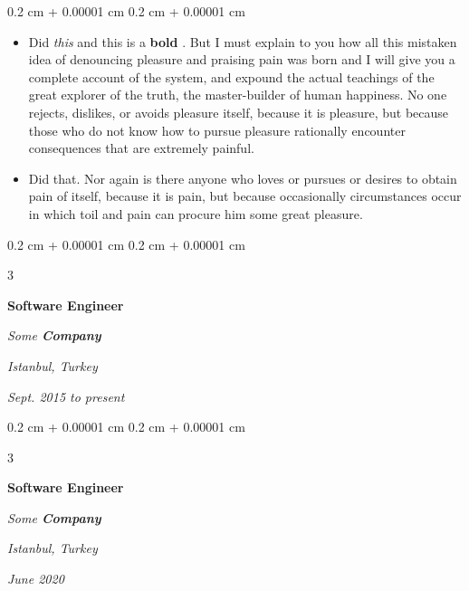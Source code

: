 \documentclass[10pt, letterpaper]{article}
\newenvironment{highlights}{
    \begin{itemize}[
        topsep=0.10 cm,
        parsep=0.10 cm,
        partopsep=0pt,
        itemsep=0pt,
        leftmargin=0.4 cm + 10pt + 0.6 cm
    ]
}{
    \end{itemize}
} %
\newenvironment{onecolentry}{
    \begin{adjustwidth}{
        0.2 cm + 0.00001 cm
    }{
        0.2 cm + 0.00001 cm
    }
}{
    \end{adjustwidth}
} %
\newenvironment{threecolentry}[3][]{
    \onecolentry
    \def\thirdColumn{#3}
    \setcolumnwidth{0.6 cm, \fill, 4.5 cm}
    \begin{paracol}{3}
    #2 \switchcolumn
}{
    \switchcolumn \raggedleft \thirdColumn
    \end{paracol}
    \endonecolentry
} %
\let\hrefWithoutArrow\href
\renewcommand{\href}[2]{\hrefWithoutArrow{#1}{\mbox{\ifthenelse{\equal{#2}{}}{ }{#2 }\raisebox{.15ex}{\footnotesize \faExternalLink*}}}}
\begin{document}
        \vspace{0.10 cm-3px}
        \begin{onecolentry}
            \begin{highlights}
                \item Did \textit{this} and this is a \textbf{bold} \href{https://example.com}{link}. But I must explain to you how all this mistaken idea of denouncing pleasure and praising pain was born and I will give you a complete account of the system, and expound the actual teachings of the great explorer of the truth, the master-builder of human happiness. No one rejects, dislikes, or avoids pleasure itself, because it is pleasure, but because those who do not know how to pursue pleasure rationally encounter consequences that are extremely painful.
                \item Did that. Nor again is there anyone who loves or pursues or desires to obtain pain of itself, because it is pain, but because occasionally circumstances occur in which toil and pain can procure him some great pleasure.
            \end{highlights}
        \end{onecolentry}


        \vspace{0.2 cm-3px}

        \begin{threecolentry}{
            \vspace*{\fill}
            \textbullet
            \vspace*{3px}
            \vspace*{\fill}
        }{
        \textit{Istanbul, Turkey}    
            
        \textit{Sept. 2015 to present}}
            \textbf{Software Engineer}
            
            \textit{Some \textbf{Company}}
        \end{threecolentry}



        \vspace{0.2 cm-3px}

        \begin{threecolentry}{
            \vspace*{\fill}
            \textbullet
            \vspace*{3px}
            \vspace*{\fill}
        }{
        \textit{Istanbul, Turkey}    
            
        \textit{June 2020}}
            \textbf{Software Engineer}
            
            \textit{Some \textbf{Company}}
        \end{threecolentry}
\end{document}
